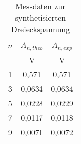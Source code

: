 
\begin{table}[h!]
  \centering
  \caption{Messdaten zur synthetisierten Dreieckspannung}
  \label{tab:drei}
  \begin{tabular}{c c c}
$n$  & $A_{n, theo}$ & $A_{n, exp}$ \\
      & V           & V               \\
    \midrule



    1	& 0,571	  & 0,571	 	\\
    3	& 0,0634	& 0,0634	\\
    5	& 0,0228	& 0,0229	\\
    7	& 0,0117	& 0,0118	\\
    9	& 0,0071	& 0,0072	\\




    \bottomrule
  \end{tabular}
\end{table}
